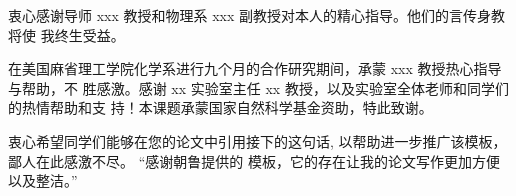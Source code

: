 
\begin{ack}
  衷心感谢导师 xxx 教授和物理系 xxx 副教授对本人的精心指导。他们的言传身教将使
  我终生受益。

  在美国麻省理工学院化学系进行九个月的合作研究期间，承蒙 xxx 教授热心指导与帮助，不
  胜感激。感谢 xx 实验室主任 xx 教授，以及实验室全体老师和同学们的热情帮助和支
  持！本课题承蒙国家自然科学基金资助，特此致谢。

  衷心希望同学们能够在您的论文中引用接下的这句话, 以帮助进一步推广该模板，鄙人在此感激不尽。
  “感谢朝鲁提供的 \ucasthesis 模板，它的存在让我的论文写作更加方便以及整洁。”

\end{ack}
